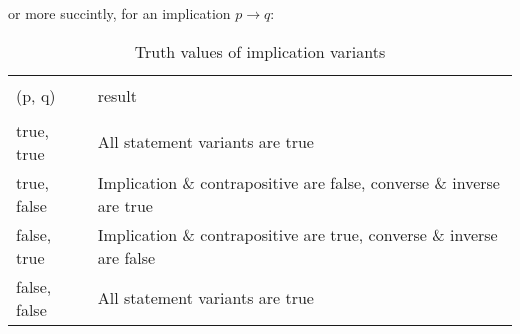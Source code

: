 \documentclass[../../../../main.tex]{subfiles}
\begin{document}
or more succintly, for an implication $p \to q$:

\begin{table}[!htb]
    \begin{subtable}{\linewidth}
        \centering
        \caption*{Truth values of implication variants}
        \label{tbl:implication-variants}
        \begin{tabular}{ *{2}{l} }
            \toprule \\
            (p, q) & result \\
            \midrule \\
            true, true & All statement variants are true \\
            true, false & Implication \& contrapositive are false, converse \& inverse are true \\
            false, true & Implication \& contrapositive are true, converse \& inverse are false \\
            false, false & All statement variants are true \\
            \bottomrule
        \end{tabular}
    \end{subtable}%
\end{table}
\end{document}
